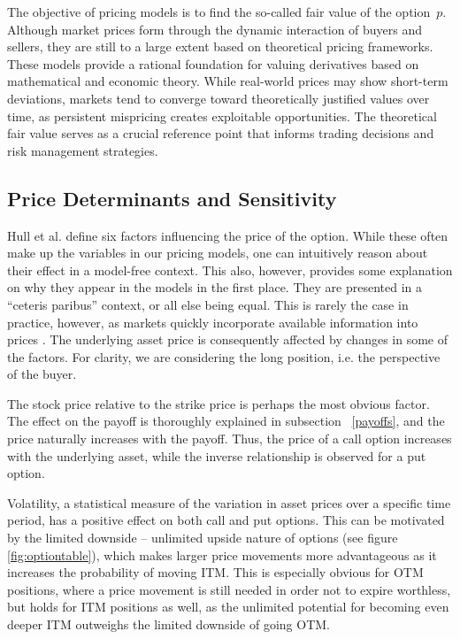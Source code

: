 \documentclass[english,12pt,a4paper,pdftex,sci,utf8]{aaltothesis}
\begin{document}
The objective of pricing models is to find the so-called fair value of the option~$p$. Although market prices form through the dynamic interaction of buyers and sellers, they are still to a large extent based on theoretical pricing frameworks. These models provide a rational foundation for valuing derivatives based on mathematical and economic theory. While real-world prices may show short-term deviations, markets tend to converge toward theoretically justified values over time, as persistent mispricing creates exploitable opportunities. The theoretical fair value serves as a crucial reference point that informs trading decisions and risk management strategies.


\subsection{Price Determinants and Sensitivity}

Hull et al. \cite{hull2013fundamentals} define six factors influencing the price of the option. While these often make up the variables in our pricing models, one can intuitively reason about their effect in a model-free context. This also, however, provides some explanation on why they appear in the models in the first place. They are presented in a ``ceteris paribus'' context, or all else being equal. This is rarely the case in practice, however, as markets quickly incorporate available information into prices \cite{fama1970efficient}. The underlying asset price is consequently affected by changes in some of the factors. For clarity, we are considering the long position, i.e. the perspective of the buyer.

The stock price relative to the strike price is perhaps the most obvious factor. The effect on the payoff is thoroughly explained in subsection ~\ref{payoffs}, and the price naturally increases with the payoff. Thus, the price of a call option increases with the underlying asset, while the inverse relationship is observed for a put option.

Volatility, a statistical measure of the variation in asset prices over a specific time period, has a positive effect on both call and put options. This can be motivated by the limited downside -- unlimited upside nature of options (see figure \ref{fig:optiontable}), which makes larger price movements more advantageous as it increases the probability of moving ITM. This is especially obvious for OTM positions, where a price movement is still needed in order not to expire worthless, but holds for ITM positions as well, as the unlimited potential for becoming even deeper ITM outweighs the limited downside of going OTM.
\end{document}
